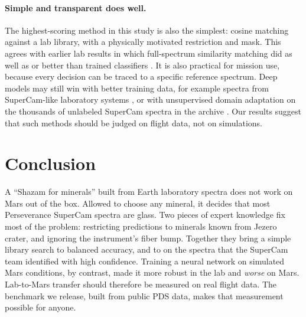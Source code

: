 \paragraph{Simple and transparent does well.} The highest-scoring method in this study is also the simplest: cosine matching against a lab library, with a physically motivated restriction and mask. This agrees with earlier lab results in which full-spectrum similarity matching did as well as or better than trained classifiers \citep{carey2015machine}. It is also practical for mission use, because every decision can be traced to a specific reference spectrum. Deep models may still win with better training data, for example spectra from SuperCam-like laboratory systems \citep{manrique2024simulcam}, or with unsupervised domain adaptation on the thousands of unlabeled SuperCam spectra in the archive \citep{ganin2016domain}. Our results suggest that such methods should be judged on flight data, not on simulations.



\section{Conclusion}
\label{sec:conclusion}
A ``Shazam for minerals'' built from Earth laboratory spectra does not work on Mars out of the box. Allowed to choose any mineral, it decides that most Perseverance SuperCam spectra are glass. Two pieces of expert knowledge fix most of the problem: restricting predictions to minerals known from Jezero crater, and ignoring the instrument's fiber bump. Together they bring a simple library search to \balCosineWindowMars{} balanced accuracy, and to \confHighCW{} on the spectra that the SuperCam team identified with high confidence. Training a neural network on simulated Mars conditions, by contrast, made it more robust in the lab and \emph{worse} on Mars. Lab-to-Mars transfer should therefore be measured on real flight data. The benchmark we release, built from public PDS data, makes that measurement possible for anyone.
